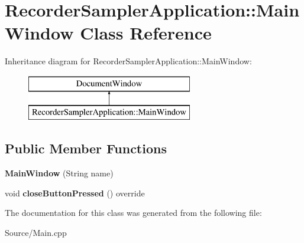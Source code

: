 \hypertarget{class_recorder_sampler_application_1_1_main_window}{}\section{Recorder\+Sampler\+Application\+::Main\+Window Class Reference}
\label{class_recorder_sampler_application_1_1_main_window}
Inheritance diagram for Recorder\+Sampler\+Application\+::Main\+Window\+:\begin{figure}[H]
\begin{center}
\leavevmode
\includegraphics[height=2.000000cm]{class_recorder_sampler_application_1_1_main_window}
\end{center}
\end{figure}
\subsection*{Public Member Functions}
\begin{DoxyCompactItemize}
\item 
\mbox{\label{class_recorder_sampler_application_1_1_main_window_a10ae597b8ea6c5591e0954e6f6e760f9}} 
{\bfseries Main\+Window} (String name)
\item 
\mbox{\label{class_recorder_sampler_application_1_1_main_window_accea077761d34ed08f26df4294e5570a}} 
void {\bfseries close\+Button\+Pressed} () override
\end{DoxyCompactItemize}


The documentation for this class was generated from the following file\+:\begin{DoxyCompactItemize}
\item 
Source/Main.\+cpp\end{DoxyCompactItemize}

